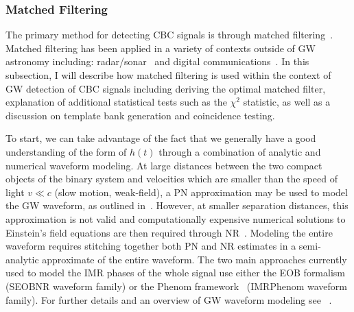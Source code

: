 \subsubsection{Matched Filtering}\label{sec:matched_filtering}

The primary method for detecting \ac{CBC} signals is through 
matched filtering~\cite{PhysRevD.60.022002}. 
Matched filtering has been applied in a variety of contexts outside of \ac{GW} 
astronomy including: radar/sonar~\cite{WOODWARD1953100} and digital 
communications~\cite{doi:10.1080/00207217408900375}. In this subsection, 
I will describe how matched filtering is used within the context of 
\ac{GW} detection of \ac{CBC} signals including deriving the 
optimal matched filter, explanation of additional statistical 
tests such as the $\chi^2$ statistic, as well as
a discussion on template bank generation and coincidence testing.

%
%
To start, we can take advantage of the fact that we generally have a good understanding of the form of $h(t)$ through a combination of analytic and numerical waveform modeling. 
At large distances between the two compact 
objects of the binary system and velocities which are smaller 
than the speed of light $v \ll c$ (slow motion, weak-field), 
a \ac{PN} approximation may be used to model the \ac{GW} 
waveform, as outlined in~\cite{Will5938,Blanchet2014}. 
However, at smaller separation distances, 
this approximation is not valid and computationally expensive 
numerical solutions to Einstein's field equations are 
then required through \ac{NR}~\cite{Cardoso2015}. Modeling 
the entire waveform requires stitching together both \ac{PN} 
and \ac{NR} estimates in a semi-analytic 
approximate of the entire waveform. 
The two main approaches currently used to model the 
\ac{IMR} phases of the whole signal use either the 
\ac{EOB} formalism~\cite{PhysRevD.89.061502} (SEOBNR waveform family) or the 
\ac{Phenom} framework~\cite{PhysRevD.93.044006,PhysRevD.93.044007} 
(IMRPhenom waveform family). For further 
details and an overview of \ac{GW} waveform modeling 
see ~\cite{10.3389/fspas.2020.00028}.

